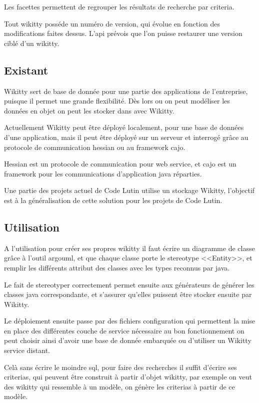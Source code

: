 Les facettes permettent de regrouper les résultats de recherche par criteria. 

Tout wikitty posséde un numéro de version, qui évolue en fonction des
modifications faites dessus. L'api prévois que l'on puisse restaurer une version
ciblé d'un wikitty.

\subsection{Existant}

Wikitty sert de base de donnée pour une partie des applications de l'entreprise,
puisque il permet une grande flexibilité. Dès lors ou on peut modéliser les
données en objet on peut les stocker dans avec Wikitty.

Actuellement Wikitty peut être déployé localement, pour une base de données
d'une application, mais il peut être déployé sur un serveur et interrogé grâce
au protocole de communication hessian ou au framework cajo.

Hessian est un protocole de communication pour web service, et cajo est un
framework pour les communications d'application java réparties. 

Une partie des projets actuel de Code Lutin utilise un stockage Wikitty, 
l'objectif est à la généralisation de cette solution pour les projets de 
Code Lutin.

\subsection{Utilisation}

A l'utilisation pour créer ses propres wikitty il faut écrire un diagramme de
classe grâce à l'outil argouml, et que chaque classe porte le stereotype
<<Entity>>, et remplir les différents attribut des classes avec les types
reconnus par java. 

Le fait de stereotyper correctement permet ensuite aux générateurs de générer
les classes java correspondante, et s'assurer qu'elles puissent être stocker
ensuite par Wikitty.

Le déploiement ensuite passe par des fichiers configuration qui permettent la
mise en place des différentes couche de service nécessaire au bon fonctionnement
on peut choisir ainsi d'avoir une base de donnée embarquée ou d'utiliser un
Wikitty service distant.

Celà sans écrire le moindre sql, pour faire des recherches il suffit d'écrire
ses criterias, qui peuvent être construit à partir d'objet wikitty, par exemple 
on veut des wikitty qui ressemble à un modèle, on génère les criterias à partir
de ce modèle.

